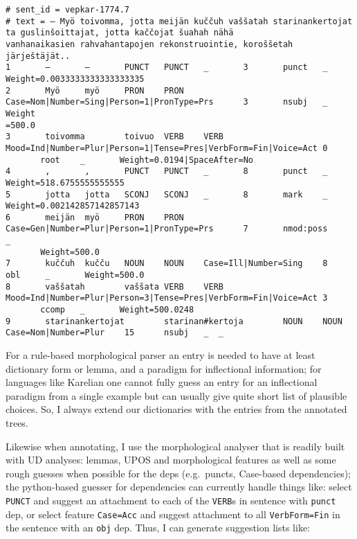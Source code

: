 \documentclass[11pt]{article}
\begin{document}
\begin{scriptsize}
\begin{verbatim}
# sent_id = vepkar-1774.7
# text = – Myö toivomma, jotta meijän kuččuh vaššatah starinankertojat ta guslinšoittajat, jotta kaččojat šuahah nähä
vanhanaikasien rahvahantapojen rekonstruointie, koroššetah järještäjät..
1       –       –       PUNCT   PUNCT   _       3       punct   _       Weight=0.0033333333333333335
2       Myö     myö     PRON    PRON    Case=Nom|Number=Sing|Person=1|PronType=Prs      3       nsubj   _       Weight
=500.0
3       toivomma        toivuo  VERB    VERB    Mood=Ind|Number=Plur|Person=1|Tense=Pres|VerbForm=Fin|Voice=Act 0
       root    _       Weight=0.0194|SpaceAfter=No
4       ,       ,       PUNCT   PUNCT   _       8       punct   _       Weight=518.6755555555555
5       jotta   jotta   SCONJ   SCONJ   _       8       mark    _       Weight=0.002142857142857143
6       meijän  myö     PRON    PRON    Case=Gen|Number=Plur|Person=1|PronType=Prs      7       nmod:poss       _
       Weight=500.0
7       kuččuh  kučču   NOUN    NOUN    Case=Ill|Number=Sing    8       obl     _       Weight=500.0
8       vaššatah        vaššata VERB    VERB    Mood=Ind|Number=Plur|Person=3|Tense=Pres|VerbForm=Fin|Voice=Act 3
       ccomp   _       Weight=500.0248
9       starinankertojat        starinan#kertoja        NOUN    NOUN Case=Nom|Number=Plur    15      nsubj   _  _
\end{verbatim}
\end{scriptsize}

For a rule-based morphological parser an entry is needed to have at least
dictionary form or lemma, and a paradigm for inflectional information; for
languages like Karelian one cannot fully guess an entry for an inflectional
paradigm from a single example but can usually give quite short list of
plausible choices. So, I always extend our dictionaries with the entries from
the annotated trees.


Likewise when annotating, I use the morphological analyser that is readily
built with UD analyses: lemmas, UPOS and morphological features as well as
some rough guesses when possible for the deps (e.g.\ puncts, Case-based
dependencies); the python-based guesser for dependencies can currently handle
things like: select \texttt{PUNCT} and suggest an attachment to each of the
\texttt{VERB}s in sentence with \texttt{punct} dep,
or select feature \texttt{Case=Acc} and suggest attachment to all
\texttt{VerbForm=Fin} in the sentence with an \texttt{obj} dep.
Thus, I can generate suggestion lists like:
\end{document}
